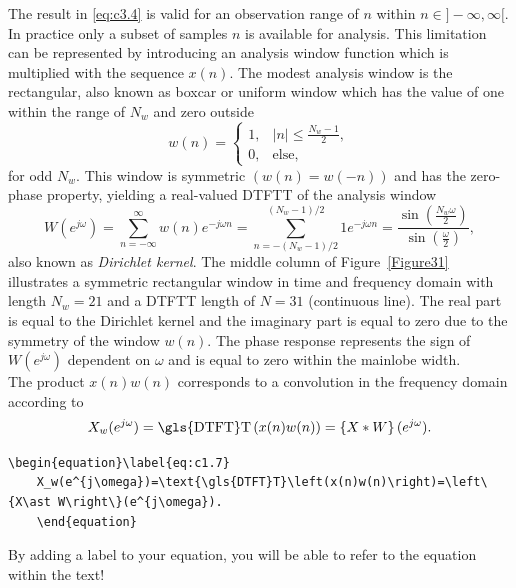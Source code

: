 \noindent The result in \eqref{eq:c3.4} is valid for an observation range of $n$ within $n\in]-\infty,\infty[$. In practice only a subset of samples $n$ is available for analysis. This limitation can be represented by introducing an analysis window function which is multiplied with the sequence $x(n)$. The modest analysis window is the rectangular, also known as boxcar or uniform window which has the value of one within the range of $N_w$ and zero outside
\begin{equation}\label{eq:c3.5}
w(n)=\begin{cases}1, & |n|\leq\frac{N_w-1}{2},\\
0, & \text{else},
\end{cases}
\end{equation}
for odd $N_w$.
This window is symmetric $(w(n)=w(-n))$ and has the zero-phase property, yielding a real-valued \gls{DTFT}T of the analysis window
\begin{equation}\label{eq:c3.6}
W(e^{j\omega})=\sum_{n=-\infty}^{\infty}w(n)e^{-j\omega n}=\sum_{n=-(N_w-1)/{2}}^{(N_w-1)/{2}}1e^{-j\omega n}=\frac{\sin\left(\frac{N_w\omega}{2}\right)}{\sin\left(\frac{\omega}{2}\right)},
\end{equation}
also known as \textit{Dirichlet kernel}. The middle column of Figure~\ref{Figure31} illustrates a symmetric rectangular window in time and frequency domain with length $N_w=21$ and a \gls{DTFT}T length of $N=31$ (continuous line). The real part is equal to the Dirichlet kernel and the imaginary part is equal to zero due to the symmetry of the window $w(n)$. The phase response represents the sign of $W(e^{j\omega})$ dependent on $\omega$ and is equal to zero within the mainlobe width.\\

\noindent The product $x(n)w(n)$ corresponds to a convolution in the frequency domain according to
\begin{equation}\label{eq:c1.7}
X_w(e^{j\omega})=\text{\gls{DTFT}T}\left(x(n)w(n)\right)=\left\{X\ast W\right\}(e^{j\omega}).
\end{equation}

\begin{mdframed}
	\begin{lstlisting}[language = Tex, caption={Add formulars to your text}]
	\begin{equation}\label{eq:c1.7}
	X_w(e^{j\omega})=\text{\gls{DTFT}T}\left(x(n)w(n)\right)=\left\{X\ast W\right\}(e^{j\omega}).
	\end{equation}
	\end{lstlisting}
	By adding a label to your equation, you will be able to refer to the equation within the text!
\end{mdframed}

